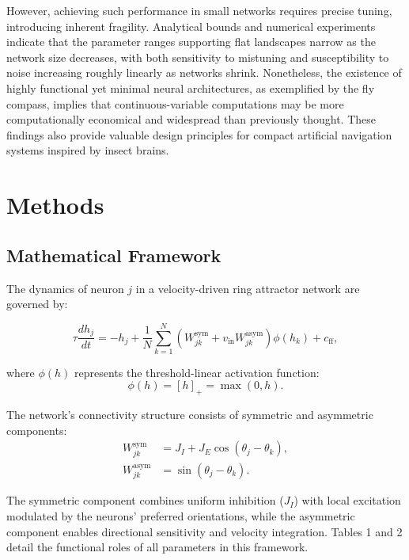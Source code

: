 \documentclass[11pt,a4paper]{article}
\begin{document}
However, achieving such performance in small networks requires precise tuning, introducing inherent fragility. Analytical bounds and numerical experiments indicate that the parameter ranges supporting flat landscapes narrow as the network size decreases, with both sensitivity to mistuning and susceptibility to noise increasing roughly linearly as networks shrink. Nonetheless, the existence of highly functional yet minimal neural architectures, as exemplified by the fly compass, implies that continuous-variable computations may be more computationally economical and widespread than previously thought. These findings also provide valuable design principles for compact artificial navigation systems inspired by insect brains.


\section*{Methods}
\subsection{Mathematical Framework}
The dynamics of neuron \( j \) in a velocity-driven ring attractor network are governed by:

\begin{equation}
\tau \frac{d h_j}{dt} = -h_j + \frac{1}{N} \sum_{k=1}^N \left( W^{\text{sym}}_{jk} + v_{\text{in}} W^{\text{asym}}_{jk} \right) \phi(h_k) + c_{\text{ff}},
\label{eq:ring_dynamics}
\end{equation}

where \(\phi(h)\) represents the threshold-linear activation function:
\[
\phi(h) = [h]_+ = \max(0, h).
\]

The network's connectivity structure consists of symmetric and asymmetric components:
\begin{align}
W^{\text{sym}}_{jk} &= J_I + J_E \cos(\theta_j - \theta_k), \\
W^{\text{asym}}_{jk} &= \sin(\theta_j - \theta_k).
\end{align}

The symmetric component combines uniform inhibition (\(J_I\)) with local excitation modulated by the neurons' preferred orientations, while the asymmetric component enables directional sensitivity and velocity integration. Tables 1 and 2 detail the functional roles of all parameters in this framework.

\end{document}
